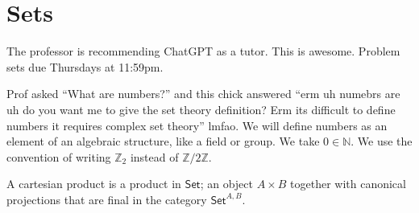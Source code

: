 \chapter{Sets}
The professor is recommending ChatGPT as a tutor. This is awesome. Problem sets due Thursdays at 11:59pm.

Prof asked ``What are numbers?'' and this chick answered ``erm uh numebrs are uh do you want me to give the set theory definition? Erm its difficult to define numbers it requires complex set theory'' lmfao. We will define numbers as an element of an algebraic structure, like a field or group. We take $0\in\mathbb{N}$. We use the convention of writing $\mathbb{Z}_2$ instead of $\mathbb{Z}/2\mathbb{Z}$.

A cartesian product is a product in $\mathsf{Set}$; an object $A\times B$ together with canonical projections that are final in the category $\mathsf{Set}^{A,B}$.
